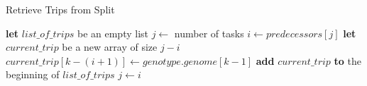 \begin{algorithm}[thbp]
\caption{Retrieve Trips from Split}\label{split-retrieve-pseudocode}
\begin{algorithmic}[1]

	\State \textbf{let} $list\_of\_trips$ be an empty list
	\State $j \leftarrow$ number of tasks
	\DoWhile
		\State $i \leftarrow predecessors[j]$
		\State \textbf{let} $current\_trip$ be a new array of size $j - i$
			\State $current\_trip[k-(i+1)] \leftarrow genotype.genome[k-1]$
		\EndFor
		\State \textbf{add} $current\_trip$ \textbf{to} the beginning of $list\_of\_trips$
		\State $j \leftarrow i$
\EndProcedure

\end{algorithmic}
\end{algorithm}



\cleardoublepage
